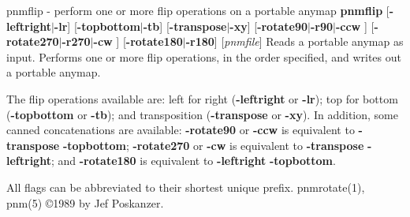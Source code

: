 %

\newpage
%

pnmflip - perform one or more flip operations on a portable anymap
{\bf pnmflip}
{\rm [}{\bf -leftright}{\rm $|$}{\bf -lr}{\rm ]}
{\rm [}{\bf -topbottom}{\rm $|$}{\bf -tb}{\rm ]}
{\rm [}{\bf -transpose}{\rm $|$}{\bf -xy}{\rm ]}
{\rm [}{\bf -rotate90}{\rm $|$}{\bf -r90}{\rm $|$}{\bf -ccw}
{\rm ]}
{\rm [}{\bf -rotate270}{\rm $|$}{\bf -r270}{\rm $|$}{\bf -cw}
{\rm ]}
{\rm [}{\bf -rotate180}{\rm $|$}{\bf -r180}{\rm ]}
{\rm [}{\it pnmfile}{\rm ]}
Reads a portable anymap as input.
Performs one or more flip operations, in the order specified, and
writes out a portable anymap.
\par
The flip operations available are: left for right
{\rm (}{\bf -leftright}
or
{\bf -lr}{\rm );}
top for bottom
{\rm (}{\bf -topbottom}
or
{\bf -tb}{\rm );}
and transposition
{\rm (}{\bf -transpose}
or
{\bf -xy}{\rm ).}
In addition, some canned concatenations are available:
{\bf -rotate90}
or
{\bf -ccw}
is equivalent to
{\bf -transpose}
{\bf -topbottom}{\rm ;}
{\bf -rotate270}
or
{\bf -cw}
is equivalent to
{\bf -transpose}
{\bf -leftright}{\rm ;}
and
{\bf -rotate180}
is equivalent to
{\bf -leftright}
{\bf -topbottom}{\rm .}
\par
All flags can be abbreviated to their shortest unique prefix.
pnmrotate(1), pnm(5)
\copyright 1989 by Jef Poskanzer.
%
 
%

